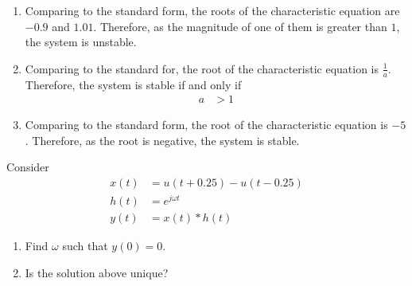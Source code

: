 \documentclass[fleqn, a4paper, 11pt, oneside]{amsart}
\theoremstyle{definition}
\theoremstyle{theorem}
\begin{document}
\begin{solution}
	\begin{enumerate}[leftmargin=*]
		\item
			Comparing to the standard form, the roots of the characteristic equation are $-0.9$ and $1.01$.
			Therefore, as the magnitude of one of them is greater than $1$, the system is unstable.
		\item
			Comparing to the standard for, the root of the characteristic equation is $\frac{1}{a}$.
			Therefore, the system is stable if and only if
			\begin{align*}
				a & > 1
			\end{align*}
		\item
			Comparing to the standard form, the root of the characteristic equation is $-5$.
			Therefore, as the root is negative, the system is stable.
	\end{enumerate}
\end{solution}

\begin{question}
	Consider
	\begin{align*}
		x(t) & = u(t + 0.25) - u(t - 0.25) \\
		h(t) & = e^{j \omega t}            \\
		y(t) & = x(t) \ast h(t)
	\end{align*}
	\begin{enumerate}
		\item Find $\omega$ such that $y(0) = 0$.
		\item Is the solution above unique?
	\end{enumerate}
\end{question}
\end{document}
